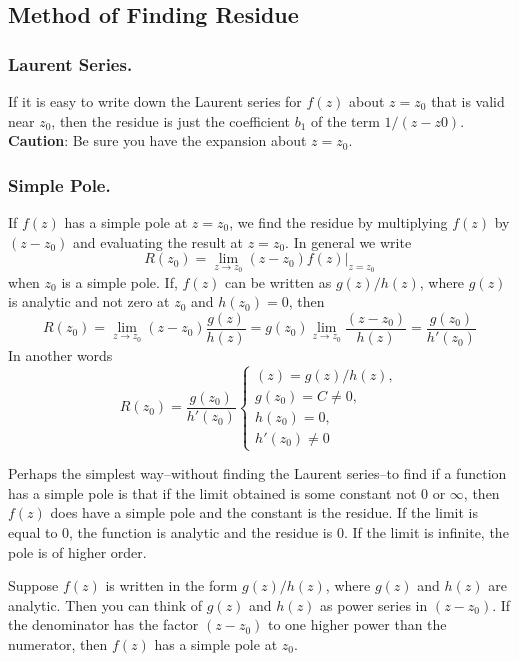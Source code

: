 \documentclass[../../../main.tex]{subfiles}
\begin{document}
\subsection{Method of Finding Residue}
\subsubsection{Laurent Series.} If it is easy to write down the Laurent series for $f (z)$ about $z = z_0$ that is valid near $z_0$, then the residue is just the coefficient $b_1$ of the term $1/(z - z0)$. \textbf{Caution}: Be sure you have the expansion about $z = z_0$.

\subsubsection{Simple Pole.} If $f (z)$ has a simple pole at $z = z_0$, we find the residue by multiplying $f (z)$ by $(z - z_0)$ and evaluating the result at $z = z_0$. In general we write
\begin{equation*}
    R(z_0) = \lim_{z\rightarrow z_0} (z - z_0)f (z)\bigg|_{z=z_0}
\end{equation*}
when $z_0$ is a simple pole. If, $f (z)$ can be written as $g(z)/h(z)$, where $g(z)$ is analytic and not zero at $z_0$ and $h(z_0) = 0$, then
\begin{equation*}
    R(z_0) = \lim_{z\rightarrow z_0} (z - z_0)\frac{g(z)}{h(z)}
    =g(z_0)\lim_{z\rightarrow z_0}\frac{ (z - z_0)}{h(z)}
    =\frac{g(z_0)}{h'(z_0)}
\end{equation*}
In another words
\begin{equation*}
    R(z_0)=\frac{g(z_0)}{h'(z_0)}\begin{cases}
        (z) = g(z)/h(z), \\
        g(z_0) =C\neq 0, \\
        h(z_0) = 0,      \\
        h'(z_0) \neq  0
    \end{cases}
\end{equation*}

Perhaps the simplest way--without finding the Laurent series--to find if a function has a simple pole is that if the limit obtained is some constant not $0$ or $\infty$, then $f (z)$ does have a simple pole and the constant is the residue. If the limit is equal to 0, the function is analytic and the residue is 0. If the limit is infinite, the pole is of higher order.

Suppose $f (z)$ is written in the form $g(z)/h(z)$, where $g(z)$ and $h(z)$ are analytic. Then you can think of $g(z)$ and $h(z)$ as power series in $(z - z_0)$. If the denominator has the factor $(z - z_0)$ to one higher power than the numerator, then $f (z)$ has a simple pole at $z_0$.
\end{document}
